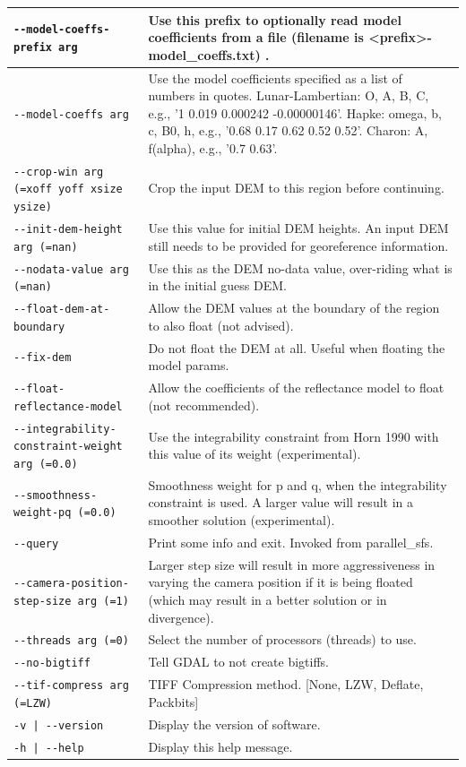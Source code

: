 \begin{longtable}{|l|p{7.5cm}|}
\texttt{-\/-model-coeffs-prefix arg} & Use this prefix to optionally read model coefficients from a file (filename is <prefix>-model\_coeffs.txt) .\\ \hline
\texttt{-\/-model-coeffs arg} & Use the model coefficients specified as a list of numbers in quotes. Lunar-Lambertian: O, A, B, C, e.g., '1 0.019 0.000242 -0.00000146'. Hapke: omega, b, c, B0, h, e.g., '0.68 0.17 0.62 0.52 0.52'. Charon: A, f(alpha), e.g., '0.7 0.63'.\\ \hline
\texttt{-\/-crop-win arg (=xoff yoff xsize ysize)} & Crop the input DEM to this region before continuing.\\ \hline
\texttt{-\/-init-dem-height arg (=nan)} & Use this value for initial DEM heights. An input DEM still needs to be provided for georeference information.\\ \hline
\texttt{-\/-nodata-value arg (=nan)} & Use this as the DEM no-data value, over-riding what is in the initial guess DEM.\\ \hline
\texttt{-\/-float-dem-at-boundary} & Allow the DEM values at the boundary of the region to also float (not advised).\\ \hline
\texttt{-\/-fix-dem} & Do not float the DEM at all. Useful when floating the model params.\\ \hline
\texttt{-\/-float-reflectance-model} & Allow the coefficients of the reflectance model to float (not recommended).\\ \hline
\texttt{-\/-integrability-constraint-weight arg (=0.0)} & Use the integrability constraint from Horn 1990 with this value of its weight (experimental).\\ \hline
\texttt{-\/-smoothness-weight-pq (=0.0)} & Smoothness weight for p and q, when the integrability constraint is used. A larger value will result in a smoother solution (experimental).\\ \hline
\texttt{-\/-query} & Print some info and exit. Invoked from parallel\_sfs.\\ \hline
\texttt{-\/-camera-position-step-size arg (=1)} & Larger step size will result in more aggressiveness in varying the camera position if it is being floated (which may result in a better solution or in divergence).\\ \hline
\texttt{-\/-threads arg (=0)} & Select the number of processors (threads) to use.\\ \hline
\texttt{-\/-no-bigtiff} & Tell GDAL to not create bigtiffs.\\ \hline
\texttt{-\/-tif-compress arg (=LZW)} & TIFF Compression method. [None, LZW, Deflate, Packbits]\\ \hline
\texttt{-v | -\/-version } & Display the version of software.\\ \hline
\texttt{-h | -\/-help } & Display this help message.\\ \hline
\end{longtable}

